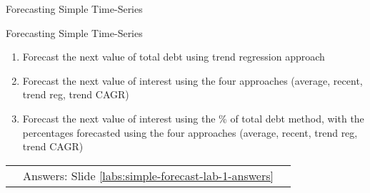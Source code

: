 \documentclass[handout, 11pt]{beamer}
\begin{document}
\begin{section}{Forecasting Simple Time-Series}
\begin{frame}
{\begin{block}{Forecasting Simple Time-Series}
\begin{enumerate}
\item Forecast the next value of total debt using trend regression approach
\item Forecast the next value of interest using the four approaches (average, recent, trend reg, trend CAGR)
\item Forecast the next value of interest using the \% of total debt method, with the percentages forecasted using the four approaches (average, recent, trend reg, trend CAGR)
\end{enumerate}
\vfill
\begin{tabular*}{\textwidth}{@{\extracolsep{\fill}}ccc}
\toprule
\hfill & Answers: Slide \textcolor{blue}{\underline{\ref{labs:simple-forecast-lab-1-answers}}} & \hfill\\

\end{tabular*}
\end{block}
}
\label{labs:simple-forecast-lab-1}
\end{frame}
\end{section}
\end{document}

